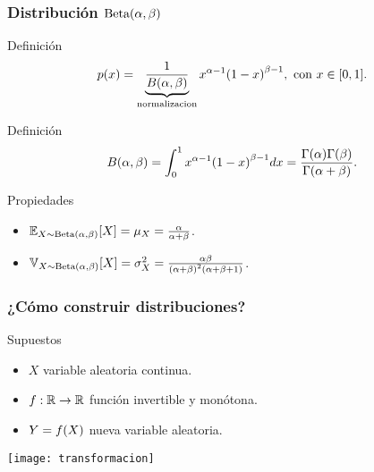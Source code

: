 \documentclass[table]{beamer}
\begin{document}
\begin{frame}
    \frametitle{Distribución $\betadist{\alpha}{\beta}$}
    \begin{block}{Definición}
        \begin{equation*}
            \pdf{x} = \underbrace{\frac{1}{\betafunc{\alpha}{\beta}}}_{\text{normalizacion}} x^{\alpha - 1} \parens{1 - x}^{\beta- 1} ,
            \text{ con } x \in \sparens{0, 1} .
        \end{equation*}
    \end{block}
    \begin{block}{Definición}
        \begin{equation*}
            \betafunc{\alpha}{\beta} =
            \int_{0}^{1} x^{\alpha - 1} \parens{1 - x}^{\beta - 1} dx =
            \frac{\gammafunc{\alpha} \gammafunc{\beta}}{\gammafunc{\alpha + \beta}} .
        \end{equation*}
    \end{block}
    \begin{block}{Propiedades}
        \begin{itemize}
            \item $\expecteddist{X \sim \betadist{\alpha}{\beta}}{X} = \mu_{X} = \frac{\alpha}{\alpha + \beta}$.
            \item $\variancedist{X \sim \betadist{\alpha}{\beta}}{X} = \sigma^{2}_{X} = \frac{\alpha \beta}{\parens{\alpha + \beta}^{2} \parens{\alpha + \beta + 1}}$.
        \end{itemize}
    \end{block}
\end{frame}

\begin{frame}
    \frametitle{¿Cómo construir distribuciones?}
    \begin{block}{Supuestos}
        \begin{itemize}
            \item $X$ variable aleatoria continua.
            \item $f : \mathbb{R} \rightarrow \mathbb{R}$ función invertible y monótona.
            \item $Y = \ff{X}$ nueva variable aleatoria.
        \end{itemize}
    \end{block}
    \begin{center}
        \texttt{[image: transformacion]}
    \end{center}
\end{frame}
\end{document}
